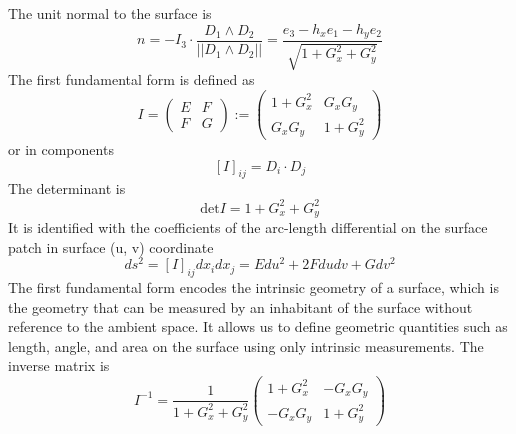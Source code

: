 \documentclass{amsart}
\begin{document}
The unit normal to the surface is
\[
n = -I_3 \cdot \frac{D_1 \wedge D_2} {||D_1 \wedge D_2 ||} = \frac{ e_3 - h_x e_1 - h_y e_2 }{\sqrt{ 1+ G_x^2+ G_y^2}} 
\]
The first fundamental form is defined as
\[
I = \begin{pmatrix}
	E & F \\
	F & G
\end{pmatrix}
:= \begin{pmatrix}
	1+ G_x^2 &  G_x G_y \\
	G_x G_y  &  1+ G_y^2 
\end{pmatrix}
\]
or in components
\[
[I]_{ij} = D_i \cdot D_j
\]
The determinant is
\[
\mathrm{det} I = 1 + G_x^2 + G_y^2
\]
It is identified with the coefficients of the arc-length differential on the surface patch in surface (u, v) coordinate
\[
ds^2=  [I]_{ij}dx_i dx_j=  E du^2+ 2 F du dv + G dv^2
\]
The first fundamental form encodes the intrinsic geometry of a surface, which is the geometry that can be measured by an inhabitant of the surface without reference to the ambient space.
It allows us to define geometric quantities such as length, angle, and area on the surface using only intrinsic measurements.
The inverse matrix is 
\[
I^{-1} = \frac{1}{1 + G_x^2 + G_y^2} \begin{pmatrix}
	1+ G_x^2 &  -G_x G_y \\
	-G_x G_y  &  1+ G_y^2 
\end{pmatrix}
\]
\end{document}
